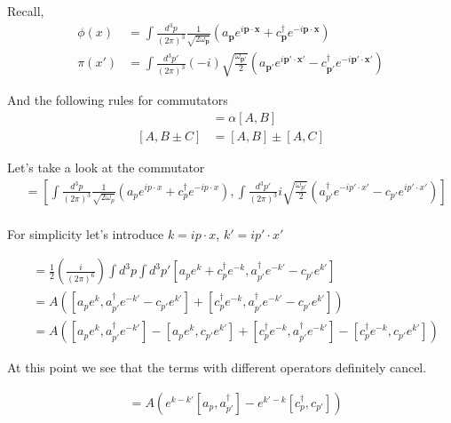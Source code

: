 \documentclass[working, oneside]{../../Preambles/tuftebook}
\begin{document}
\begin{solution}
Recall,
\begin{align*}
\phi(x) &= \int \frac{d^3p}{(2\pi)^3} \frac{1}{\sqrt{2\omega_{\mathbf{p}}}} (a_{\mathbf{p}} e^{i\mathbf{p}\cdot\mathbf{x}} + c_{\mathbf{p}}^{\dagger} e^{-i\mathbf{p}\cdot\mathbf{x}}) \\
\pi(x') &= \int \frac{d^3p'}{(2\pi)^3} (-i) \sqrt{\frac{\omega_{\mathbf{p'}}}{2}} (a_{\mathbf{p'}} e^{i\mathbf{p'}\cdot\mathbf{x'}} - c_{\mathbf{p'}}^{\dagger} e^{-i\mathbf{p'}\cdot\mathbf{x'}})
\end{align*}

And the following rules for commutators
\begin{align*}
[\alpha A, B] &= \alpha [A, B] \\
[A, B \pm C] &= [A, B] \pm [A, C]
\end{align*}

Let's take a look at the commutator
\begin{align*}
[\phi(x), \pi(x')] &= \left[ \int \frac{d^3p}{(2\pi)^3} \frac{1}{\sqrt{2\omega_p}} (a_p e^{ip\cdot x} + c_p^\dagger e^{-ip\cdot x}), \int \frac{d^3p'}{(2\pi)^3} i \sqrt{\frac{\omega_{p'}}{2}} (a_{p'}^\dagger e^{-ip'\cdot x'} - c_{p'} e^{ip'\cdot x'}) \right] \\
\end{align*}

For simplicity let's introduce $k = ip\cdot x$, $k' = ip'\cdot x'$

\begin{align*}
&= \frac{1}{2} \left( \frac{i}{(2\pi)^6} \right) \int d^3p \int d^3p' \left[ a_p e^k + c_p^\dagger e^{-k}, a_{p'}^\dagger e^{-k'} - c_{p'} e^{k'} \right] \\
&= A \left( \left[ a_p e^k, a_{p'}^\dagger e^{-k'} - c_{p'} e^{k'} \right] + \left[ c_p^\dagger e^{-k}, a_{p'}^\dagger e^{-k'} - c_{p'} e^{k'} \right] \right) \\
&= A \left( \left[ a_p e^k, a_{p'}^\dagger e^{-k'} \right] - \left[ a_p e^k, c_{p'} e^{k'} \right] + \left[ c_p^\dagger e^{-k}, a_{p'}^\dagger e^{-k'} \right] - \left[ c_p^\dagger e^{-k}, c_{p'} e^{k'} \right] \right)
\end{align*}

At this point we see that the terms with different operators definitely cancel.

\begin{align*}
&= A \left( e^{k-k'} [a_p, a_{p'}^\dagger] - e^{k'-k} [c_p^\dagger, c_{p'}] \right)
\end{align*}


\end{solution}
\end{document}

